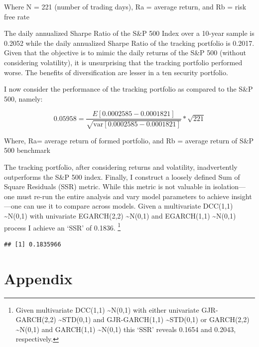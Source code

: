\documentclass[]{elsarticle} %
\newenvironment{Shaded}{\begin{snugshade}}{\end{snugshade}}
\newcommand{\KeywordTok}[1]{\textcolor[rgb]{0.13,0.29,0.53}{\textbf{{#1}}}}
\newcommand{\DataTypeTok}[1]{\textcolor[rgb]{0.13,0.29,0.53}{{#1}}}
\newcommand{\DecValTok}[1]{\textcolor[rgb]{0.00,0.00,0.81}{{#1}}}
\newcommand{\StringTok}[1]{\textcolor[rgb]{0.31,0.60,0.02}{{#1}}}
\newcommand{\OtherTok}[1]{\textcolor[rgb]{0.56,0.35,0.01}{{#1}}}
\newcommand{\NormalTok}[1]{{#1}}
\begin{document}
Where N = 221 (number of trading days), Ra = average return, and Rb =
risk free rate

The daily annualized Sharpe Ratio of the S\&P 500 Index over a 10-year
sample is 0.2052 while the daily annualized Sharpe Ratio of the tracking
portfolio is 0.2017. Given that the objective is to mimic the daily
returns of the S\&P 500 (without considering volatility), it is
unsurprising that the tracking portfolio performed worse. The benefits
of diversification are lesser in a ten security portfolio.

I now consider the performance of the tracking portfolio as compared to
the S\&P 500, namely:

\[0.05958 = \frac{E[0.0002585-0.0001821]}{\sqrt{\mathrm{var}[0.0002585-0.0001821]}} * \sqrt{221}\]

Where, Ra= average return of formed portfolio, and Rb = average return
of S\&P 500 benchmark

The tracking portfolio, after considering returns and volatility,
inadvertently outperforms the S\&P 500 index. Finally, I construct a
loosely defined Sum of Square Residuals (SSR) metric. While this metric
is not valuable in isolation---one must re-run the entire analysis and
vary model parameters to achieve insight ---one can use it to compare
across models. Given a multivariate DCC(1,1) \textasciitilde{}N(0,1)
with univariate EGARCH(2,2) \textasciitilde{}N(0,1) and EGARCH(1,1)
\textasciitilde{}N(0,1) process I achieve an `SSR' of 0.1836. \footnote{Given
  multivariate DCC(1,1) \textasciitilde{}N(0,1) with either univariate
  GJR-GARCH(2,2) \textasciitilde{}STD(0,1) and GJR-GARCH(1,1)
  \textasciitilde{}STD(0,1) or GARCH(2,2) \textasciitilde{}N(0,1) and
  GARCH(1,1) \textasciitilde{}N(0,1) this `SSR' reveals 0.1654 and
  0.2043, respectively.}

\begin{Shaded}
\end{Shaded}

\begin{verbatim}
## [1] 0.1835966
\end{verbatim}

\section{Appendix}\label{appendix}
\end{document}
